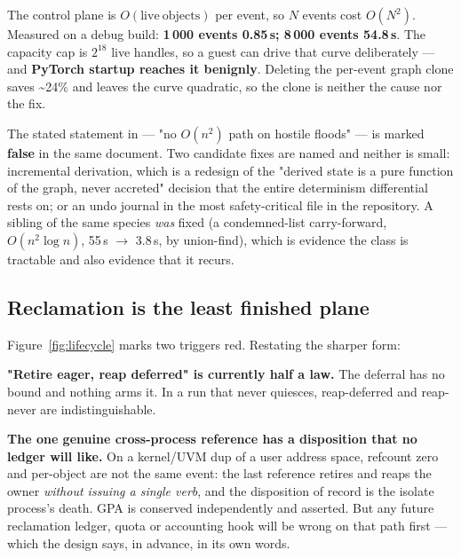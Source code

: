 \documentclass[10.5pt]{article}
\begin{document}
\begin{warnbox}\small
The control plane is $O(\mathrm{live\ objects})$ per event, so $N$ events cost $O(N^2)$. Measured on
a debug build: \textbf{1\,000 events 0.85\,s; 8\,000 events 54.8\,s}. The capacity cap is
$2^{18}$ live handles, so a guest can drive that curve deliberately — and \textbf{PyTorch startup
reaches it benignly}. Deleting the per-event graph clone saves \textasciitilde24\% and leaves the
curve quadratic, so the clone is neither the cause nor the fix.
\end{warnbox}

The stated statement in  — "no $O(n^2)$ path on hostile floods" — is marked
\textbf{false} in the same document. Two candidate fixes are named and neither is small:
incremental derivation, which is a redesign of the "derived state is a pure function of the
graph, never accreted" decision that the entire determinism differential rests on; or an undo
journal in the most safety-critical file in the repository. A sibling of the same species
\emph{was} fixed (a condemned-list carry-forward, $O(n^2 \log n)$, 55\,s $\to$ 3.8\,s, by
union-find), which is evidence the class is tractable and also evidence that it recurs.

\subsection{Reclamation is the least finished plane}

Figure~\ref{fig:lifecycle} marks two triggers red. Restating the sharper form:

\textbf{"Retire eager, reap deferred" is currently half a law.} The deferral has no bound and
nothing arms it. In a run that never quiesces, reap-deferred and reap-never are indistinguishable.

\textbf{The one genuine cross-process reference has a disposition that no ledger will like.} On a
kernel/UVM dup of a user address space, refcount zero and per-object  are not the same
event: the last reference retires and reaps the owner \emph{without issuing a single 
verb}, and the disposition of record is the isolate process's death. GPA is conserved
independently and asserted. But any future reclamation ledger, quota or accounting hook will be
wrong on that path first — which the design says, in advance, in its own words.
\end{document}
